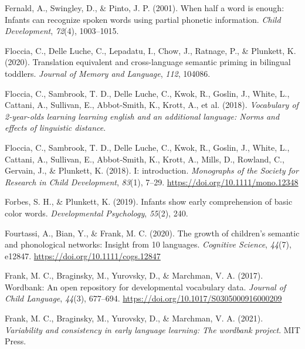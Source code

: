 \documentclass[
  12pt,
  b5paperpaper,
  twoside]{scrreprt}
\newlength{\cslhangindent}
\newlength{\cslentryspacingunit} %
\newenvironment{CSLReferences}[2] %
 {%
  \setlength{\parindent}{0pt}
  \ifodd #1
  \let\oldpar\par
  \def\par{\hangindent=\cslhangindent\oldpar}
  \fi
  \setlength{\parskip}{#2\cslentryspacingunit}
 }%
 {}
\begin{document}
\begin{CSLReferences}{1}{0}
\leavevmode{}%
Fernald, A., Swingley, D., \& Pinto, J. P. (2001). When half a word is
enough: Infants can recognize spoken words using partial phonetic
information. \emph{Child Development}, \emph{72}(4), 1003--1015.

\leavevmode{}%
Floccia, C., Delle Luche, C., Lepadatu, I., Chow, J., Ratnage, P., \&
Plunkett, K. (2020). Translation equivalent and cross-language semantic
priming in bilingual toddlers. \emph{Journal of Memory and Language},
\emph{112}, 104086.

\leavevmode{}%
Floccia, C., Sambrook, T. D., Delle Luche, C., Kwok, R., Goslin, J.,
White, L., Cattani, A., Sullivan, E., Abbot-Smith, K., Krott, A., et al.
(2018). \emph{Vocabulary of 2-year-olds learning learning english and an
additional language: Norms and effects of linguistic distance}.

\leavevmode{}%
Floccia, C., Sambrook, T. D., Delle Luche, C., Kwok, R., Goslin, J.,
White, L., Cattani, A., Sullivan, E., Abbot‐Smith, K., Krott, A., Mills,
D., Rowland, C., Gervain, J., \& Plunkett, K. (2018). I: introduction.
\emph{Monographs of the Society for Research in Child Development},
\emph{83}(1), 7--29. \url{https://doi.org/10.1111/mono.12348}

\leavevmode{}%
Forbes, S. H., \& Plunkett, K. (2019). Infants show early comprehension
of basic color words. \emph{Developmental Psychology}, \emph{55}(2),
240.

\leavevmode{}%
Fourtassi, A., Bian, Y., \& Frank, M. C. (2020). The growth of
children's semantic and phonological networks: Insight from 10
languages. \emph{Cognitive Science}, \emph{44}(7), e12847.
\url{https://doi.org/10.1111/cogs.12847}

\leavevmode{}%
Frank, M. C., Braginsky, M., Yurovsky, D., \& Marchman, V. A. (2017).
Wordbank: An open repository for developmental vocabulary data.
\emph{Journal of Child Language}, \emph{44}(3), 677--694.
\url{https://doi.org/10.1017/S0305000916000209}

\leavevmode{}%
Frank, M. C., Braginsky, M., Yurovsky, D., \& Marchman, V. A. (2021).
\emph{Variability and consistency in early language learning: The
wordbank project}. {MIT} Press.


\end{CSLReferences}
\end{document}
